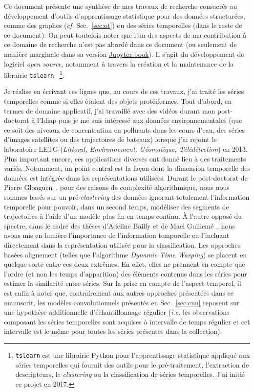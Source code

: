 Ce document présente une synthèse de mes travaux de recherche consacrés au
développement d'outils d'apprentissage statistique pour des données structurées,
comme des graphes (\emph{cf.} Sec.~\ref{sec:ot}) ou des séries temporelles
(dans le reste de ce document).
On peut toutefois noter que l'un des aspects de ma contribution à ce domaine de
recherche n'est pas abordé dans ce document (ou seulement de manière marginale
dans sa version
\href{https://rtavenar.github.io/hdr/}{Jupyter book}). Il s'agit du
développement de logiciel \emph{open source}, notamment à travers la création
et la maintenance de la librairie \texttt{tslearn}~\cite{tslearn}%
\footnote{\texttt{tslearn} est une librairie Python pour l'apprentissage
statistique appliqué aux séries temporelles qui fournit des outils pour le
pré-traitement, l'extraction de descripteurs, le \emph{clustering} ou la
classification de séries temporelles. J'ai initié ce projet en 2017.}.

Je réalise en écrivant ces lignes que, au cours de ces travaux, j'ai traité les
séries temporelles comme si elles étaient des objets protéiformes.
Tout d'abord, en termes de domaine applicatif, j'ai travaillé avec des vidéos
durant mon post-doctorat à l'Idiap puis je me suis intéressé aux données
environnementales (que ce soit des niveaux de concentration en polluants dans
les cours d'eau, des séries d'images satellites ou des trajectoires de bateaux)
lorsque j'ai rejoint le laboratoire LETG (\emph{Littoral, Environnement,
Géomatique, Télédétection}) en 2013.
Plus important encore, ces applications diverses ont donné lieu à des
traitements variés.
Notamment, un point central est la façon dont la dimension temporelle des
données est intégrée dans les représentations utilisées.
Durant le post-doctorat de Pierre Gloaguen~\cite{gloaguen2020}, pour des raisons
de complexité algorithmique, nous nous sommes basés sur un pré-\emph{clustering}
des données ignorant totalement l'information temporelle pour pouvoir, dans un
second temps, modéliser des segments de trajectoires à l'aide d'un modèle plus
fin en temps continu.
À l'autre opposé du spectre, dans le cadre des thèses d'Adeline Bailly et de
Mael Guillemé~\cite{guilleme:hal-02513295,tavenard:halshs-01561461},
nous avons mis en lumière l'importance de l'information temporelle en l'incluant
directement dans la représentation utilisée pour la classification.
Les approches basées alignement (telles que l'algorithme
\emph{Dynamic Time Warping})
se placent en quelque sorte entre ces deux extrêmes.
En effet, elles ne prennent en compte que l'ordre (et non les temps
d'apparition) des éléments contenus dans les séries pour estimer la
similarité entre séries.
Sur la prise en compte de l'aspect temporel, il est enfin à noter que,
contrairement aux autres approches présentées dans ce manuscrit, les modèles
convolutionnels présentés en Sec.~\ref{sec:cnn} reposent sur une hypothèse
additionnelle d'échantillonnage régulier (\emph{i.e.}
les observations composant les séries temporelles sont acquises à intervalle de
temps régulier et cet intervalle est le même pour toutes les séries présentes
dans la collection).

